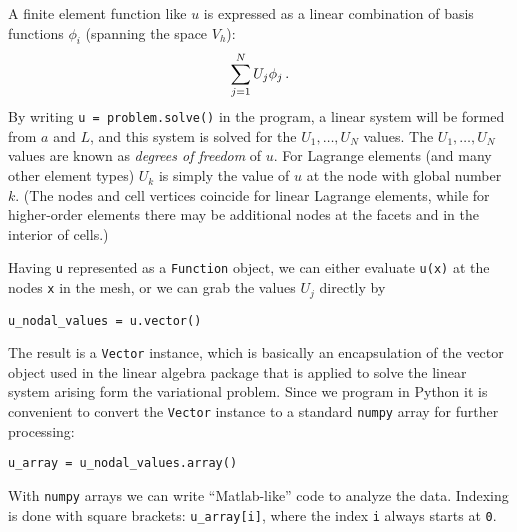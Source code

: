 A finite element function like $u$ is expressed as a linear combination
of basis functions $\phi_i$ (spanning the space $V_h$):
\begin{equation}
\sum_{j=1}^N U_j \phi_j\label{langtangen:poisson1:ufem}\thinspace .
\end{equation}
By writing {\fontsize{12pt}{12pt}\verb!u = problem.solve()!} in the program, a linear system
will be formed from $a$ and $L$, and this system is solved for the
$U_1,\ldots,U_N$ values. The $U_1,\ldots,U_N$ values are known
as \emph{degrees of freedom} of $u$. For Lagrange elements (and many other
element types) $U_k$ is simply the value of $u$ at the node 
with global number $k$.
(The nodes and cell vertices coincide for linear Lagrange elements, while
for higher-order elements there may be additional nodes at
the facets and in the interior of cells.)

Having {\fontsize{12pt}{12pt}\texttt{u}} represented as a {\fontsize{12pt}{12pt}\texttt{Function}} object,
we can either evaluate {\fontsize{12pt}{12pt}\texttt{u(x)}} at the nodes {\fontsize{12pt}{12pt}\texttt{x}} in the mesh,
or we can grab the values
$U_j$ directly by
\begin{Verbatim}[fontsize=\fontsize{10pt}{10pt},tabsize=8,baselinestretch=1.05,
fontfamily=tt,xleftmargin=7mm]
u_nodal_values = u.vector()
\end{Verbatim}
\noindent
The result is a \dolfin{} {\fontsize{12pt}{12pt}\verb!Vector!} instance, which is basically an
encapsulation of the vector object used in the linear algebra package
that is applied to solve the linear system arising form the
variational problem.
Since we program in Python it is convenient to convert the
{\fontsize{12pt}{12pt}\verb!Vector!} instance to a standard {\fontsize{12pt}{12pt}\verb!numpy!} array for further
processing:
\begin{Verbatim}[fontsize=\fontsize{10pt}{10pt},tabsize=8,baselinestretch=1.05,
fontfamily=tt,xleftmargin=7mm]
u_array = u_nodal_values.array()
\end{Verbatim}
\noindent
With {\fontsize{12pt}{12pt}\verb!numpy!} arrays we can write ``Matlab-like'' code to analyze
the data. Indexing is done with square brackets: {\fontsize{12pt}{12pt}\verb!u_array[i]!},
where the index {\fontsize{12pt}{12pt}\verb!i!} always starts at {\fontsize{12pt}{12pt}\texttt{0}}.

